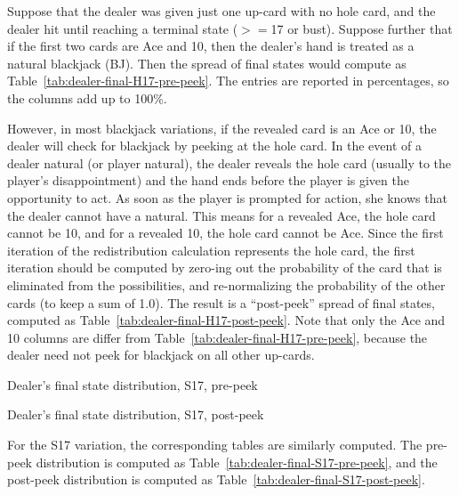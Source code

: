 Suppose that the dealer was given just one up-card with no hole card, 
and the dealer hit until reaching a terminal state ($>=$17 or bust).
Suppose further that if the first two cards are Ace and 10,
then the dealer's hand is treated as a natural blackjack (BJ).
Then the spread of final states would compute as 
Table~\ref{tab:dealer-final-H17-pre-peek}.
The entries are reported in percentages, so the columns add up to 100\%.

However, in most blackjack variations, if the revealed card is an Ace or 10, 
the dealer will check for blackjack by peeking at the hole card.
In the event of a dealer natural (or player natural), 
the dealer reveals the hole card (usually to the player's disappointment)
and the hand ends before the player is given the opportunity to act.
As soon as the player is prompted for action, she knows that the 
dealer cannot have a natural.
This means for a revealed Ace, the hole card cannot be 10, 
and for a revealed 10, the hole card cannot be Ace.
Since the first iteration of the redistribution 
calculation represents the hole card, the first iteration
should be computed by zero-ing out the probability of the
card that is eliminated from the possibilities, and re-normalizing
the probability of the other cards (to keep a sum of 1.0).  
The result is a ``post-peek'' spread of final states, computed as 
Table~\ref{tab:dealer-final-H17-post-peek}.
Note that only the Ace and 10 columns are differ from 
Table~\ref{tab:dealer-final-H17-pre-peek}, 
because the dealer need not peek for blackjack on all other up-cards.

\begin{table}[ht!]
\caption{Dealer's final state distribution, S17, pre-peek}
\begin{center}
{\small

}
\end{center}
\label{tab:dealer-final-S17-pre-peek}
\end{table}

\begin{table}[ht!]
\caption{Dealer's final state distribution, S17, post-peek}
\begin{center}
{\small

}
\end{center}
\label{tab:dealer-final-S17-post-peek}
\end{table}

For the S17 variation, the corresponding tables are similarly computed.
The pre-peek distribution is computed as 
Table~\ref{tab:dealer-final-S17-pre-peek}, 
and the post-peek distribution is computed as 
Table~\ref{tab:dealer-final-S17-post-peek}.

